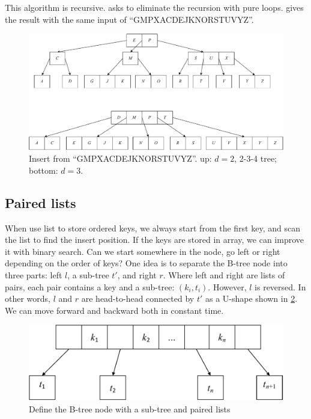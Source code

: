 \documentclass[b5paper]{article}
\begin{document}
This algorithm is recursive.  asks to eliminate the recursion with pure loops.  gives the result with the same input of ``GMPXACDEJKNORSTUVYZ''.

\begin{figure}[htbp]
  \centering
  \includegraphics[scale=0.5]{img/btree-split-insert-example}
  \caption{Insert from ``GMPXACDEJKNORSTUVYZ''. up: $d = 2$, 2-3-4 tree; bottom: $d = 3$.}
  \label{fig:btree-insert}
\end{figure}

\subsection{Paired lists}

When use list to store ordered keys, we always start from the first key, and scan the list to find the insert position. If the keys are stored in array, we can improve it with binary search. Can we start somewhere in the node, go left or right depending on the order of keys? One idea is to separate the B-tree node into three parts: left $l$, a sub-tree $t'$, and right $r$. Where left and right are lists of pairs, each pair contains a key and a sub-tree: $(k_i, t_i)$. However, $l$ is reversed. In other words, $l$ and $r$ are head-to-head connected by $t'$ as a U-shape shown in \cref{fig:paired-lists}. We can move forward and backward both in constant time.

\begin{figure}[htbp]
  \centering
  \includegraphics[scale=0.45, page=5]{img/btrees}
  \caption{Define the B-tree node with a sub-tree and paired lists}
  \label{fig:paired-lists}
\end{figure}
\end{document}
